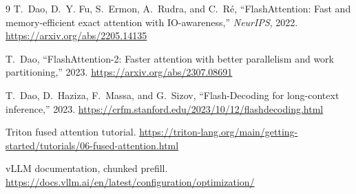 \documentclass[11pt]{article}
\begin{document}
\begin{thebibliography}{9}
T.~Dao, D.~Y. Fu, S.~Ermon, A.~Rudra, and C.~R\'e,
``FlashAttention: Fast and memory-efficient exact attention with IO-awareness,''
\emph{NeurIPS}, 2022. \url{https://arxiv.org/abs/2205.14135}

T.~Dao, ``FlashAttention-2: Faster attention with better parallelism and work
partitioning,'' 2023. \url{https://arxiv.org/abs/2307.08691}

T.~Dao, D.~Haziza, F.~Massa, and G.~Sizov, ``Flash-Decoding for long-context
inference,'' 2023. \url{https://crfm.stanford.edu/2023/10/12/flashdecoding.html}

Triton fused attention tutorial.
\url{https://triton-lang.org/main/getting-started/tutorials/06-fused-attention.html}

vLLM documentation, chunked prefill.
\url{https://docs.vllm.ai/en/latest/configuration/optimization/}
\end{thebibliography}
\end{document}
